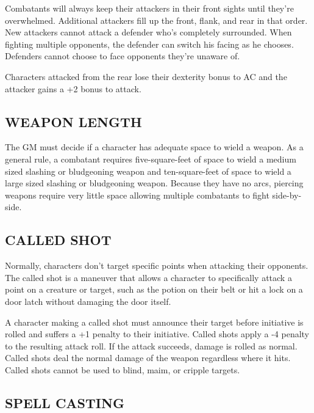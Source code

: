 \begin{multicols}{2}
\begin{minipage}{\columnwidth}
\end{minipage}

Combatants will always keep their attackers in their front sights until they're overwhelmed.  Additional attackers fill up the front, flank, and rear in that order.  New attackers cannot attack a defender who's completely surrounded.  When fighting multiple opponents, the defender can switch his facing as he chooses.  Defenders cannot choose to face opponents they're unaware of.

Characters attacked from the rear lose their dexterity bonus to AC and the attacker gains a +2 bonus to attack.

\subsection{WEAPON LENGTH}

The GM must decide if a character has adequate space to wield a weapon.  As a general rule, a combatant requires five-square-feet of space to wield a medium sized slashing or bludgeoning weapon and ten-square-feet of space to wield a large sized slashing or bludgeoning weapon.  Because they have no arcs, piercing weapons require very little space allowing multiple combatants to fight side-by-side.  
 
\subsection{CALLED SHOT}

Normally, characters don't target specific points when attacking their opponents.  The called shot is a maneuver that allows a character to specifically attack a point on a creature or target, such as the potion on their belt or hit a lock on a door latch without damaging the door itself.

A character making a called shot must announce their target before initiative is rolled and suffers a +1 penalty to their initiative.  Called shots apply a -4 penalty to the resulting attack roll.  If the attack succeeds, damage is rolled as normal.  Called shots deal the normal damage of the weapon regardless where it hits.  Called shots cannot be used to blind, maim, or cripple targets.  

\subsection{SPELL CASTING}


\end{multicols}
